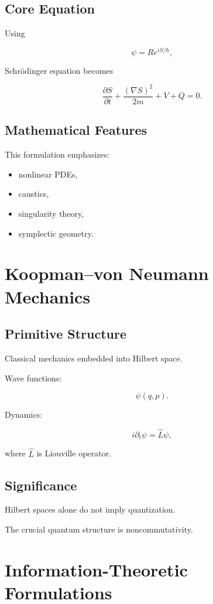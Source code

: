 \documentclass[11pt]{article}
\begin{document}
\subsection{Core Equation}

Using

\[
\psi = Re^{iS/\hbar},
\]

Schr\"odinger equation becomes

\[
\frac{\partial S}{\partial t}
+
\frac{(\nabla S)^2}{2m}
+
V
+
Q
=
0.
\]

\subsection{Mathematical Features}

This formulation emphasizes:

\begin{itemize}
\item nonlinear PDEs,
\item caustics,
\item singularity theory,
\item symplectic geometry.
\end{itemize}

\section{Koopman--von Neumann Mechanics}

\subsection{Primitive Structure}

Classical mechanics embedded into Hilbert space.

Wave functions:

\[
\psi(q,p).
\]

Dynamics:

\[
i\partial_t \psi
=
\hat L \psi,
\]

where $\hat L$ is Liouville operator.

\subsection{Significance}

Hilbert spaces alone do not imply quantization.

The crucial quantum structure is noncommutativity.

\section{Information-Theoretic Formulations}
\end{document}
